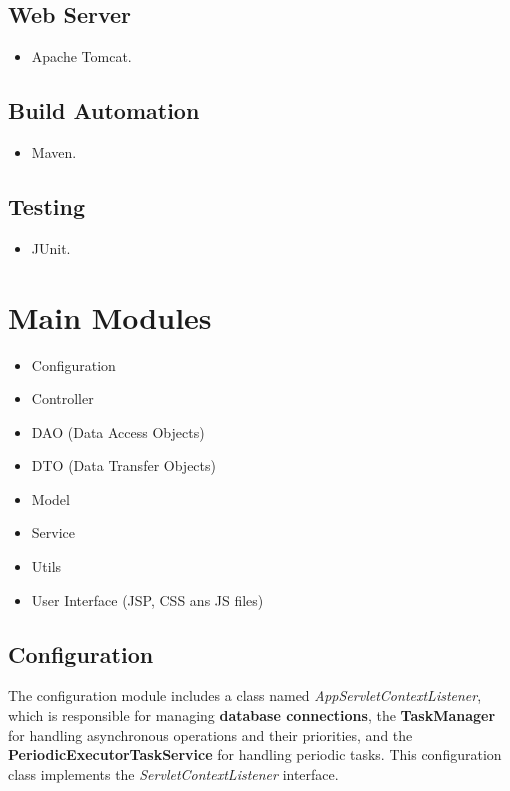 \subsection*{Web Server} 

\begin{itemize}
    \item Apache Tomcat.
\end{itemize}

\subsection*{Build Automation}

\begin{itemize}
    \item Maven.
\end{itemize}

\subsection*{Testing}

\begin{itemize}
    \item JUnit.
\end{itemize}

\section{Main Modules}
\begin{itemize}
    \item Configuration
    \item Controller
    \item DAO (Data Access Objects)
    \item DTO (Data Transfer Objects)
    \item Model 
    \item Service
    \item Utils
    \item User Interface (JSP, CSS ans JS files)
\end{itemize}

\subsection*{Configuration}

The configuration module includes a class named \textit{AppServletContextListener}, which is responsible 
for managing \textbf{database connections}, the \textbf{TaskManager} for handling asynchronous operations and their priorities, 
and the \textbf{PeriodicExecutorTaskService} for handling periodic tasks. This configuration class implements 
the \textit{ServletContextListener} interface.

